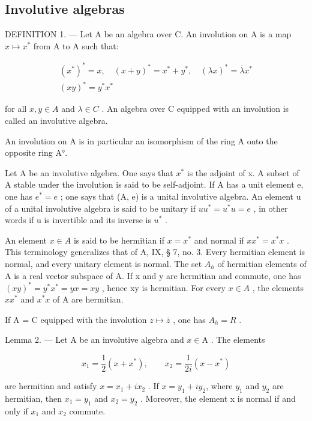 \subsection{Involutive algebras}

DEFINITION 1. --- Let A be an algebra over C. An involution on A is a map \(x \mapsto x^{*}\) from A to A such that:

\[
\begin{array}{c} (x ^ {*}) ^ {*} = x, \quad (x + y) ^ {*} = x ^ {*} + y ^ {*}, \quad (\lambda x) ^ {*} = \overline {{\lambda}} x ^ {*} \\ (x y) ^ {*} = y ^ {*} x ^ {*} \end{array}
\]

for all \(x, y \in A\) and \(\lambda \in C\) . An algebra over C equipped with an involution is called an involutive algebra.

An involution on A is in particular an isomorphism of the ring A onto the opposite ring A°.

Let A be an involutive algebra. One says that \(x^{*}\) is the adjoint of x. A subset of A stable under the involution is said to be self-adjoint. If A has a unit element e, one has \(e^{*} = e\) ; one says that (A, e) is a unital involutive algebra. An element u of a unital involutive algebra is said to be unitary if \(uu^{*} = u^{*}u = e\) , in other words if u is invertible and its inverse is \(u^{*}\) .

An element \(x \in A\) is said to be hermitian if \(x = x^{*}\) and normal if \(xx^{*} = x^{*}x\) . This terminology generalizes that of A, IX, § 7, no. 3. Every hermitian element is normal, and every unitary element is normal. The set \(A_{h}\) of hermitian elements of A is a real vector subspace of A. If x and y are hermitian and commute, one has \((xy)^{*} = y^{*}x^{*} = yx = xy\) , hence xy is hermitian. For every \(x \in A\) , the elements \(xx^{*}\) and \(x^{*}x\) of A are hermitian.

If A = C equipped with the involution \(z \mapsto \overline{z}\) , one has \(A_{h} = R\) .

Lemma 2. --- Let A be an involutive algebra and \(x \in \mathrm{A}\) . The elements

\[
x _ {1} = \frac {1}{2} (x + x ^ {*}), \qquad x _ {2} = \frac {1}{2 i} (x - x ^ {*})
\]

are hermitian and satisfy \(x = x_{1} + ix_{2}\) . If \(x = y_{1} + iy_{2}\), where \(y_{1}\) and \(y_{2}\) are hermitian, then \(x_{1} = y_{1}\) and \(x_{2} = y_{2}\) . Moreover, the element x is normal if and only if \(x_{1}\) and \(x_{2}\) commute.

